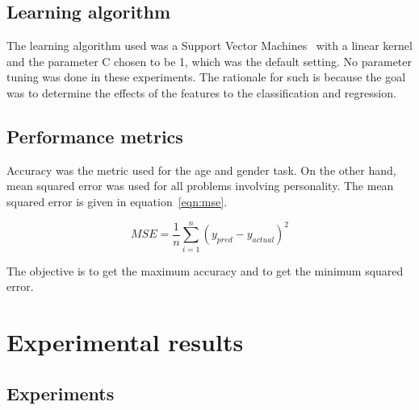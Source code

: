 \documentclass[a4paper]{llncs}
\begin{document}

\subsection{Learning algorithm}
The learning algorithm used was a Support Vector Machines~\cite{cortes1995support} with a linear kernel and the parameter C chosen to be 1, which was the default setting. No parameter tuning was done in these experiments. The rationale for such is because the goal was to determine the effects of the features to the classification and regression.  
\subsection{Performance metrics}
Accuracy was the metric used for the age and gender task. On the other hand, mean squared error was used for all problems involving personality. The mean squared error is given in equation~\ref{eqn:mse}.

\begin{equation}
MSE =\frac{1}{n} \sum_{i=1}^n \left( y_{pred}-y_{actual}\right)^2 
\label{eqn:mse}
\end{equation}


The objective is to get the maximum accuracy and to get the minimum squared error. 
\section{Experimental results}
\subsection{Experiments}
\end{document}
